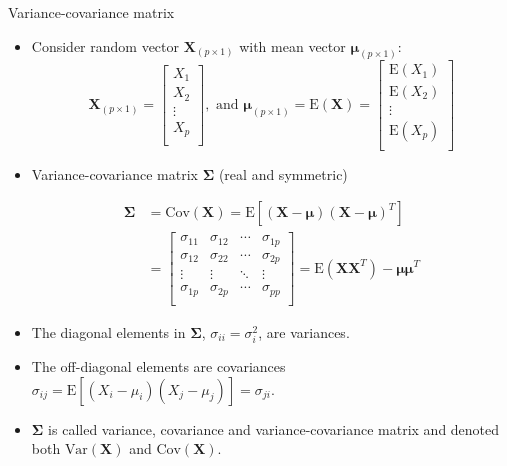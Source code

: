 \documentclass[ignorenonframetext,]{beamer}
\begin{document}
\begin{frame}

\begin{block}{Variance-covariance matrix}

\begin{itemize}
\item
  Consider random vector \(\boldsymbol{X}_{(p\times 1)}\) with mean
  vector \(\boldsymbol{\mu}_{(p\times 1)}\):
  \[\boldsymbol{X}_{(p\times 1)} =\left[ \begin{array}{c} X_1\\ X_2\\ \vdots\\ X_p\\ \end{array} \right], \text{ and }\boldsymbol{\mu}_{(p\times 1)} =\text{E}(\boldsymbol{X})=\left[ \begin{array}{c} \text{E}(X_1)\\ \text{E}(X_2)\\ \vdots\\ \text{E}(X_p)\\ \end{array}\right]\]
\item
  Variance-covariance matrix \(\boldsymbol\Sigma\) (real and symmetric)

  \begin{align*}
  \boldsymbol\Sigma & =\text{Cov}(\boldsymbol{X})  
  =\text{E}[(\boldsymbol{X}-\boldsymbol{\mu})(\boldsymbol{X}-\boldsymbol{\mu})^T] \\
  & = \left[ \begin{array}{cccc} \sigma_{11} & \sigma_{12} & \cdots & \sigma_{1p}\\ \sigma_{12} & \sigma_{22} & \cdots & \sigma_{2p}\\ \vdots & \vdots & \ddots & \vdots\\ \sigma_{1p} & \sigma_{2p} & \cdots & \sigma_{pp}\\ \end{array}  \right] 
   = \text{E}(\boldsymbol{X}\boldsymbol{X}^T)-\boldsymbol{\mu}\boldsymbol{\mu}^T
  \end{align*}
\end{itemize}

\end{block}

\end{frame}

\begin{frame}

\begin{itemize}
\item
  The diagonal elements in \(\boldsymbol\Sigma\),
  \(\sigma_{ii}=\sigma_i^2\), are variances.
\item
  The off-diagonal elements are covariances
  \(\sigma_{ij}=\text{E}[(X_i-\mu_i)(X_j-\mu_j)]=\sigma_{ji}\).
\item
  \(\boldsymbol\Sigma\) is called variance, covariance and
  variance-covariance matrix and denoted both
  \(\text{Var}(\boldsymbol{X})\) and \(\text{Cov}(\boldsymbol{X})\).
\end{itemize}

\end{frame}
\end{document}
